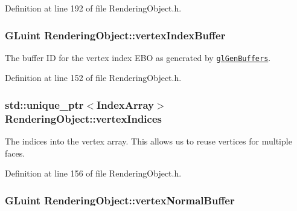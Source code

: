 Definition at line 192 of file Rendering\+Object.\+h.

\hypertarget{class_rendering_object_a6740a0a0e6bd4d841c9c211f2a31cca3}{}
\subsubsection[{vertex\+Index\+Buffer}]{\setlength{\rightskip}{0pt plus 5cm}G\+Luint Rendering\+Object\+::vertex\+Index\+Buffer\hspace{0.3cm}{\ttfamily [protected]}}\label{class_rendering_object_a6740a0a0e6bd4d841c9c211f2a31cca3}


The buffer I\+D for the vertex index E\+B\+O as generated by \href{https://www.opengl.org/sdk/docs/man/html/glGenBuffers.xhtml}{\tt gl\+Gen\+Buffers}. 



Definition at line 152 of file Rendering\+Object.\+h.

\hypertarget{class_rendering_object_a7b84487d3c34c1ca36b2ac6060b0f802}{}
\subsubsection[{vertex\+Indices}]{\setlength{\rightskip}{0pt plus 5cm}std\+::unique\+\_\+ptr$<${\bf Index\+Array}$>$ Rendering\+Object\+::vertex\+Indices\hspace{0.3cm}{\ttfamily [protected]}}\label{class_rendering_object_a7b84487d3c34c1ca36b2ac6060b0f802}


The indices into the vertex array. This allows us to reuse vertices for multiple faces. 



Definition at line 156 of file Rendering\+Object.\+h.

\hypertarget{class_rendering_object_a91649e3a653f2266cd00c718f10849f9}{}
\subsubsection[{vertex\+Normal\+Buffer}]{\setlength{\rightskip}{0pt plus 5cm}G\+Luint Rendering\+Object\+::vertex\+Normal\+Buffer\hspace{0.3cm}{\ttfamily [protected]}}\label{class_rendering_object_a91649e3a653f2266cd00c718f10849f9}


